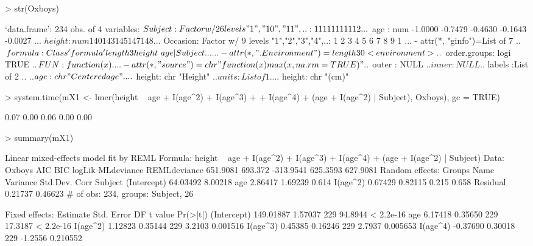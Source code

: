 \documentclass[12pt]{article}
\begin{document}
\begin{Schunk}
\begin{Sinput}
> str(Oxboys)
\end{Sinput}
\begin{Soutput}
`data.frame':	234 obs. of  4 variables:
 $ Subject : Factor w/ 26 levels "1","10","11",..: 1 1 1 1 1 1 1 1 1 12 ...
 $ age     : num  -1.0000 -0.7479 -0.4630 -0.1643 -0.0027 ...
 $ height  : num  140 143 145 147 148 ...
 $ Occasion: Factor w/ 9 levels "1","2","3","4",..: 1 2 3 4 5 6 7 8 9 1 ...
 - attr(*, "ginfo")=List of 7
  ..$ formula     :Class 'formula' length 3 height ~ age | Subject
  .. .. ..- attr(*, ".Environment")=length 30 <environment> 
  ..$ order.groups: logi TRUE
  ..$ FUN         :function (x)  
  .. ..- attr(*, "source")= chr "function (x) max(x, na.rm = TRUE)"
  ..$ outer       : NULL
  ..$ inner       : NULL
  ..$ labels      :List of 2
  .. ..$ age   : chr "Centered age"
  .. ..$ height: chr "Height"
  ..$ units       :List of 1
  .. ..$ height: chr "(cm)"
\end{Soutput}
\begin{Sinput}
> system.time(mX1 <- lmer(height ~ age + I(age^2) + I(age^3) + 
+     I(age^4) + (age + I(age^2) | Subject), Oxboys), gc = TRUE)
\end{Sinput}
\begin{Soutput}
[1] 0.07 0.00 0.06 0.00 0.00
\end{Soutput}
\begin{Sinput}
> summary(mX1)
\end{Sinput}
\begin{Soutput}
Linear mixed-effects model fit by REML
Formula: height ~ age + I(age^2) + I(age^3) + I(age^4) + (age + I(age^2) |      Subject) 
   Data: Oxboys 
      AIC     BIC    logLik MLdeviance REMLdeviance
 651.9081 693.372 -313.9541   625.3593     627.9081
Random effects:
 Groups   Name        Variance Std.Dev. Corr        
 Subject  (Intercept) 64.03492 8.00218              
          age          2.86417 1.69239  0.614       
          I(age^2)     0.67429 0.82115  0.215 0.658 
 Residual              0.21737 0.46623              
# of obs: 234, groups: Subject, 26

Fixed effects:
             Estimate Std. Error  DF t value  Pr(>|t|)
(Intercept) 149.01887    1.57037 229 94.8944 < 2.2e-16
age           6.17418    0.35650 229 17.3187 < 2.2e-16
I(age^2)      1.12823    0.35144 229  3.2103  0.001516
I(age^3)      0.45385    0.16246 229  2.7937  0.005653
I(age^4)     -0.37690    0.30018 229 -1.2556  0.210552


\end{Soutput}
\end{Schunk}
\end{document}
